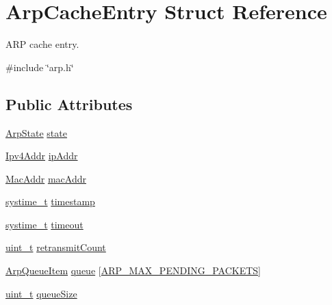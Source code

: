 \hypertarget{structArpCacheEntry}{}\section{Arp\+Cache\+Entry Struct Reference}
\label{structArpCacheEntry}


A\+RP cache entry.  




{\ttfamily \#include \char`\"{}arp.\+h\char`\"{}}

\subsection*{Public Attributes}
\begin{DoxyCompactItemize}
\item 
\hyperlink{arp_8h_a9beda55edee387702e47f03bb204deb5}{Arp\+State} \hyperlink{structArpCacheEntry_aa0bba797a4db6b52cebcd868d52e6361}{state}
\item 
\hyperlink{ipv4_8h_a411debb3d770caa0c06d3f73367da37f}{Ipv4\+Addr} \hyperlink{structArpCacheEntry_a1bea163ecbcefd764974eda38077edf1}{ip\+Addr}
\item 
\hyperlink{ethernet_8h_a1e00ed3977e8a770e8b4ae4cb306d1c0}{Mac\+Addr} \hyperlink{structArpCacheEntry_a48913a7a1aa68c83f6a34fa71091acb0}{mac\+Addr}
\item 
\hyperlink{compiler__port_8h_ae3e32a98d431a02106616da3071832dd}{systime\+\_\+t} \hyperlink{structArpCacheEntry_a10d340cfb6df76db9d3b154bdee2758c}{timestamp}
\item 
\hyperlink{compiler__port_8h_ae3e32a98d431a02106616da3071832dd}{systime\+\_\+t} \hyperlink{structArpCacheEntry_ad74ee2386d4551701aa641e9111c4df0}{timeout}
\item 
\hyperlink{compiler__port_8h_a12a1e9b3ce141648783a82445d02b58d}{uint\+\_\+t} \hyperlink{structArpCacheEntry_a94ca6d58bf237b77eec4419fceac39ab}{retransmit\+Count}
\item 
\hyperlink{structArpQueueItem}{Arp\+Queue\+Item} \hyperlink{structArpCacheEntry_a217e54562a6d3c279ce48e8a4b26b1ce}{queue} \mbox{[}\hyperlink{net__config_8h_a7f10c703fc244856512502b9d37fe636}{A\+R\+P\+\_\+\+M\+A\+X\+\_\+\+P\+E\+N\+D\+I\+N\+G\+\_\+\+P\+A\+C\+K\+E\+TS}\mbox{]}
\item 
\hyperlink{compiler__port_8h_a12a1e9b3ce141648783a82445d02b58d}{uint\+\_\+t} \hyperlink{structArpCacheEntry_af81948c9f899549e51e70c2550f4ae4f}{queue\+Size}
\end{DoxyCompactItemize}


